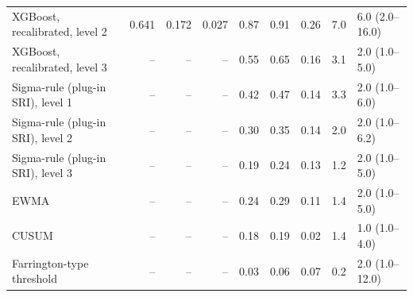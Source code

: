 \documentclass[10pt,a4paper]{article}
\begin{document}
\begin{minipage}{\linewidth}
\begin{tabular}{lrrrrrrrl}
XGBoost, recalibrated, level 2 & 0.641 & 0.172 & 0.027 & 0.87 & 0.91 & 0.26 & 7.0 & 6.0 (2.0--16.0) \\
XGBoost, recalibrated, level 3 & -- & -- & -- & 0.55 & 0.65 & 0.16 & 3.1 & 2.0 (1.0--5.0) \\
Sigma-rule (plug-in SRI), level 1 & -- & -- & -- & 0.42 & 0.47 & 0.14 & 3.3 & 2.0 (1.0--6.0) \\
Sigma-rule (plug-in SRI), level 2 & -- & -- & -- & 0.30 & 0.35 & 0.14 & 2.0 & 2.0 (1.0--6.2) \\
Sigma-rule (plug-in SRI), level 3 & -- & -- & -- & 0.19 & 0.24 & 0.13 & 1.2 & 2.0 (1.0--5.0) \\
EWMA & -- & -- & -- & 0.24 & 0.29 & 0.11 & 1.4 & 2.0 (1.0--5.0) \\
CUSUM & -- & -- & -- & 0.18 & 0.19 & 0.02 & 1.4 & 1.0 (1.0--4.0) \\
Farrington-type threshold & -- & -- & -- & 0.03 & 0.06 & 0.07 & 0.2 & 2.0 (1.0--12.0) \\
\bottomrule
\end{tabular}
\end{minipage}
\vspace{8pt}
\end{document}
